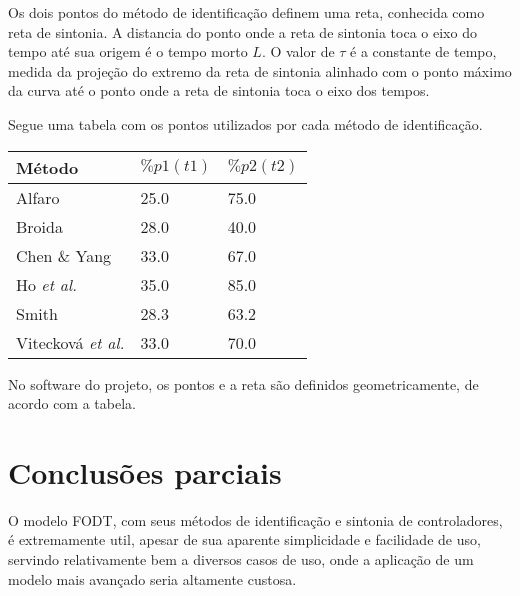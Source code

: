     Os dois pontos do método de identificação definem uma reta, conhecida
    como reta de sintonia. A distancia do ponto onde a reta de sintonia
    toca o eixo do tempo até sua origem é o tempo morto $L$. O valor de $\tau$
    é a constante de tempo, medida da projeção do extremo da reta de sintonia
    alinhado com o ponto máximo da curva até o ponto onde a reta de sintonia
    toca o eixo dos tempos.
    
    Segue uma tabela com os pontos utilizados por cada método de identificação.
    
    \begin{center}
        \begin{tabular}{l l l}
Método & $\%p1(t1)$ & $\%p2(t2)$ \\
\hline
Alfaro                    & 25.0 & 75.0 \\
Broida                    & 28.0 & 40.0 \\
Chen \& Yang              & 33.0 & 67.0 \\
Ho \textit{et al.}        & 35.0 & 85.0 \\
Smith                     & 28.3 & 63.2 \\
Vitecková \textit{et al.} & 33.0 & 70.0 \\
        \end{tabular}
    \end{center}
    
    No software do projeto, os pontos e a reta são definidos geometricamente,
    de acordo com a tabela.    

\section{Conclusões parciais}

    O modelo \acs{FODT}, com seus métodos de identificação e sintonia de
    controladores, é extremamente util, apesar de sua aparente simplicidade e
    facilidade de uso, servindo relativamente bem a diversos casos de uso, onde
    a aplicação de um modelo mais avançado seria altamente custosa.

